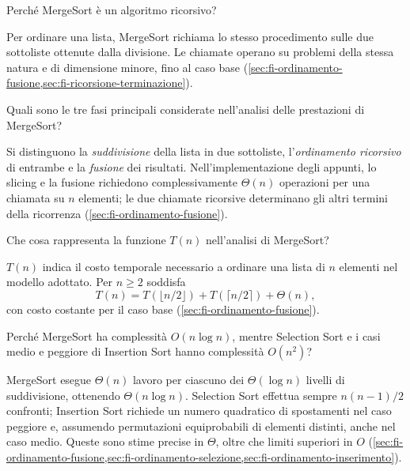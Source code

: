\begin{exercise}
\label{ex:fi-esercizi-ricerca-ordinamento-merge-ricorsivo}
Perché MergeSort è un algoritmo ricorsivo?
\end{exercise}

Per ordinare una lista, MergeSort richiama lo stesso
procedimento sulle due sottoliste ottenute dalla divisione.
Le chiamate operano su problemi della stessa natura e di
dimensione minore, fino al caso base
(\cref{sec:fi-ordinamento-fusione,sec:fi-ricorsione-terminazione}).

\begin{exercise}
\label{ex:fi-esercizi-ricerca-ordinamento-merge-fasi-costo}
Quali sono le tre fasi principali considerate nell'analisi
delle prestazioni di MergeSort?
\end{exercise}

Si distinguono la \emph{suddivisione} della lista in due
sottoliste, l'\emph{ordinamento ricorsivo} di entrambe e la
\emph{fusione} dei risultati. Nell'implementazione degli
appunti, lo slicing e la fusione richiedono complessivamente
\(\Theta(n)\) operazioni per una chiamata su \(n\) elementi;
le due chiamate ricorsive determinano gli altri termini
della ricorrenza (\cref{sec:fi-ordinamento-fusione}).

\begin{exercise}
\label{ex:fi-esercizi-ricerca-ordinamento-merge-t-n}
Che cosa rappresenta la funzione \(T(n)\) nell'analisi
di MergeSort?
\end{exercise}

\(T(n)\) indica il costo temporale necessario a ordinare
una lista di \(n\) elementi nel modello adottato.
Per \(n\ge2\) soddisfa
\[
  T(n)=T(\lfloor n/2\rfloor)
       +T(\lceil n/2\rceil)+\Theta(n),
\]
con costo costante per il caso base
(\cref{sec:fi-ordinamento-fusione}).

\begin{exercise}
\label{ex:fi-esercizi-ricerca-ordinamento-merge-confronto-costi}
Perché MergeSort ha complessità \(O(n\log n)\), mentre
Selection Sort e i casi medio e peggiore di Insertion Sort
hanno complessità \(O(n^2)\)?
\end{exercise}

MergeSort esegue \(\Theta(n)\) lavoro per ciascuno dei
\(\Theta(\log n)\) livelli di suddivisione, ottenendo
\(\Theta(n\log n)\). Selection Sort effettua sempre
\(n(n-1)/2\) confronti; Insertion Sort richiede un numero quadratico
di spostamenti nel caso peggiore e, assumendo permutazioni
equiprobabili di elementi
distinti, anche nel caso medio.
Queste sono stime precise in \(\Theta\), oltre che limiti
superiori in \(O\)
(\cref{sec:fi-ordinamento-fusione,sec:fi-ordinamento-selezione,sec:fi-ordinamento-inserimento}).

